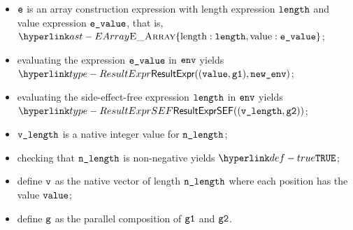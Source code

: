 \ProseParagraph
\AllApply
\begin{itemize}
  \item $\ve$ is an array construction expression with length expression $\elength$ and value expression $\evalue$,
        that is, $\EArray\{\EArrayLength: \elength, \EArrayValue: \evalue\}$;
  \item evaluating the expression $\evalue$ in $\env$ yields $\ResultExpr((\vvalue, \vgone), \newenv)$\ProseOrAbnormal;
  \item evaluating the side-effect-free expression $\elength$ in $\env$ yields \\
        $\ResultExprSEF((\vlength, \vgtwo))$\ProseOrDynErrorDiverging;
  \item $\vlength$ is a native integer value for $\nlength$;
  \item checking that $\nlength$ is non-negative yields $\True$\ProseTerminateAs{\NegativeArrayLength};
  \item define $\vv$ as the native vector of length $\nlength$ where each position has the value $\vvalue$;
  \item define $\vg$ as the parallel composition of $\vgone$ and $\vgtwo$.
\end{itemize}

\FormallyParagraph
\begin{mathpar}
\end{mathpar}

